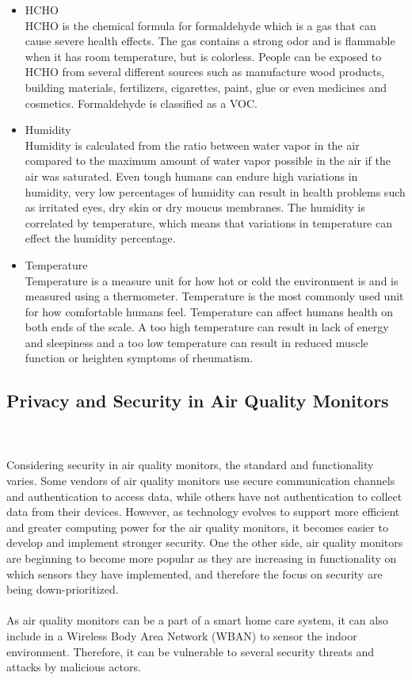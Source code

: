 \begin{itemize}
     \item HCHO\\
        HCHO is the chemical formula for formaldehyde which is a gas that can cause severe health effects. \cite{HCHO} The gas contains a strong odor and is flammable when it has room temperature, but is colorless. People can be exposed to HCHO from several different sources such as manufacture wood products, building materials, fertilizers, cigarettes, paint, glue or even medicines and cosmetics. Formaldehyde is classified as a VOC.
    \item Humidity\\
        Humidity is calculated from the ratio between water vapor in the air compared to the maximum amount of water vapor possible in the air if the air was saturated. \cite{RecommendedIAQ} Even tough humans can endure high variations in humidity, very low percentages of humidity can result in health problems such as irritated eyes, dry skin or dry moucus membranes. The humidity is correlated by temperature, which means that variations in temperature can effect the humidity percentage.
    \item Temperature\\
        Temperature is a measure unit for how hot or cold the environment is and is measured using a thermometer. Temperature is the most commonly used unit for how comfortable humans feel. Temperature can affect humans health on both ends of the scale. A too high temperature can result in lack of energy and sleepiness and a too low temperature can result in reduced muscle function or heighten symptoms of rheumatism. \cite{Temp}
\end{itemize}

\subsection*{Privacy and Security in Air Quality Monitors}
\\\\
Considering security in air quality monitors, the standard and functionality varies. \cite{AQMHowFarFunctionality} Some vendors of air quality monitors use secure communication channels and authentication to access data, while others have not authentication to collect data from their devices. However, as technology evolves to support more efficient and greater computing power for the air quality monitors, it becomes easier to develop and implement stronger security. One the other side, air quality monitors are beginning to become more popular as they are increasing in functionality on which sensors they have implemented, and therefore the focus on security are being down-prioritized. \cite{SecurityAndDataIntInAQM} 
\\\\
As air quality monitors can be a part of a smart home care system, it can also include in a Wireless Body Area Network (WBAN) to sensor the indoor environment. Therefore, it can be vulnerable to several security threats and attacks by malicious actors. \cite{AttackstoAQMs} 
\\\\

